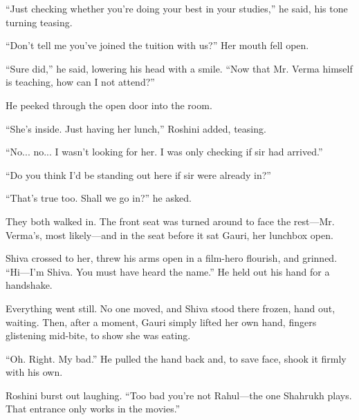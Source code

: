``Just checking whether you're doing your best in your studies,'' he said, his tone turning teasing.

``Don't tell me you've joined the tuition with us?'' Her mouth fell open.

``Sure did,'' he said, lowering his head with a smile. ``Now that Mr. Verma himself is teaching, how can I not attend?''

He peeked through the open door into the room.

``She's inside. Just having her lunch,'' Roshini added, teasing.

``No... no... I wasn't looking for her. I was only checking if sir had arrived.''

``Do you think I'd be standing out here if sir were already in?''

``That's true too. Shall we go in?'' he asked.

They both walked in. The front seat was turned around to face the rest—Mr. Verma's, most likely—and in the seat before it sat Gauri, her lunchbox open.

Shiva crossed to her, threw his arms open in a film-hero flourish, and grinned. ``Hi—I'm Shiva. You must have heard the name.'' He held out his hand for a handshake.

Everything went still. No one moved, and Shiva stood there frozen, hand out, waiting. Then, after a moment, Gauri simply lifted her own hand, fingers glistening mid-bite, to show she was eating.

``Oh. Right. My bad.'' He pulled the hand back and, to save face, shook it firmly with his own.

Roshini burst out laughing. ``Too bad you're not Rahul—the one Shahrukh plays. That entrance only works in the movies.''